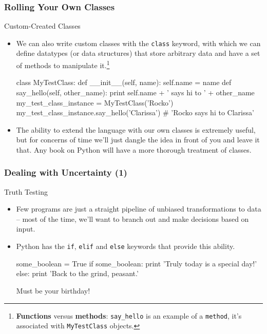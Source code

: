 \documentclass[10pt]{beamer}
\begin{document}
\begin{frame}[fragile]
  \frametitle{Rolling Your Own Classes}
  \begin{block}{Custom-Created Classes}
    \begin{itemize}
      \item We can also write custom classes with the \texttt{class} keyword, with which we can define datatypes (or data structures) that store arbitrary data and have a set of methods to manipulate it.\footnote{\textbf{Functions} versus \textbf{methods}: \texttt{say\_hello} is an example of a \texttt{method}, it's associated with \texttt{MyTestClass} objects.}
        \footnotesize
        \begin{pythoncode}
  class MyTestClass:
    def __init__(self, name):
      self.name = name
    def say_hello(self, other_name):
      print self.name + ' says hi to ' + other_name
  my_test_class_instance = MyTestClass('Rocko')
  my_test_class_instance.say_hello('Clarissa')
  # 'Rocko says hi to Clarissa'
        \end{pythoncode}
      \normalsize
      \item The ability to extend the language with our own classes is extremely useful, but for concerns of time we'll just dangle the idea in front of you and leave it that.
        Any book on Python will have a more thorough treatment of classes.
    \end{itemize}
  \end{block}
\end{frame}
      

\begin{frame}[fragile]
  \frametitle{Dealing with Uncertainty (1)}
  \begin{block}{Truth Testing}
    \begin{itemize}
      \item Few programs are just a straight pipeline of unbiased transformations to data -- most of the time, we'll want to branch out and make decisions based on input.
      \item Python has the \texttt{if}, \texttt{elif} and \texttt{else} keywords that provide this ability.
        \begin{pythoncode}
  some_boolean = True
  if some_boolean:
    print 'Truly today is a special day!'
  else:
    print 'Back to the grind, peasant.'
        \end{pythoncode}
      Must be your birthday!
    \end{itemize}
  \end{block}
\end{frame}
      
\end{document}
